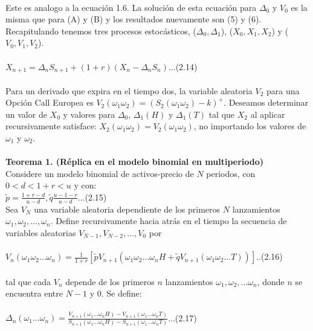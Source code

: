 \documentclass{article}
\begin{document}
        \\
        Este es analogo a la ecuación 1.6. La solución de esta ecuación para \(\Delta_0\) y \(V_0\) es la misma que para (A) y (B) y los resultados nuevamente son (5) y (6).
        \\
        Recapitulando tenemos tres procesos estocásticos, (\(\Delta_0, \Delta_1\)), (\(X_0, X_1, X_2\)) y (\(V_0, V_1, V_2\)).
        \\
        \\
        \(X_{n+1} = \Delta_n S_{n+1} + (1+r) (X_n - \Delta_n S_n)\)...(2.14)
        \\
        \\
        Para un derivado que expira en el tiempo dos, la variable aleatoria \(V_2\) para una Opción Call Europea es \(V_2(\omega_1 \omega_2) = (S_2(\omega_1 \omega_2) - k)^+\).
        Deseamos determinar un valor de \(X_0\) y valores para \(\Delta_0\), \(\Delta_1(H)\) y \(\Delta_1(T)\) tal que \(X_2\) al aplicar recursivamente satisface: 
        \(X_2(\omega_1 \omega_2) = V_2(\omega_1 \omega_2)\), no importando los valores de \(\omega_1\) y \(\omega_2\).
        \\
        \\
        \textbf{Teorema 1. (Réplica en el modelo binomial en multiperiodo)}
        \\
        Considere un modelo binomial de activos-precio de \(N\) periodos, con \(0<d<1+r<u\) y con:
        \\
        \(\tilde{p} = \frac{1+r-d}{u-d}, \tilde{q}\frac{u-1-r}{u-d}\)...(2.15)
        \\
        Sea \(V_N\) una variable aleatoria dependiente de los primeros \(N\)
        lanzamientos \(\omega_1,\omega_2, \dots, \omega_n\).
        Define recursivamente hacia atrás en el tiempo la secuencia de variables aleatorias \(V_{N-1}, V_{N-2}, \dots, V_0\) por
        \\
        \\
        \(V_n(\omega_1 \omega_2 \dots \omega_n) = \frac{1}{1+r} [\tilde{p} V_{n+1} (\omega_1 \omega_2 \dots \omega_n H + \tilde{q} V_{n+1} (\omega_1 \omega_2 \dots T))]\)..(2.16)
        \\
        \\
        tal que cada \(V_n\) depende de los primeros \(n\) lanzamientos \(\omega_1, \omega_2, \dots \omega_n\), donde \(n\) se encuentra entre \(N-1\) y \(0\). Se define:
        \\
        \\
        \(\Delta_n(\omega_1 \dots \omega_n) = \frac{V_{n+1} (\omega_1 \dots \omega_n H) - V_{n+1} (\omega_1 \dots \omega_n T)}{S_{n+1} (\omega_1 \dots \omega_n H) - S_{n+1} (\omega_1 \dots \omega_n T)}\)...(2.17)
\end{document}
